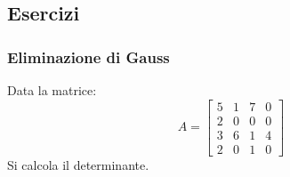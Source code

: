 \documentclass[a4paper]{article}
\begin{document}
	\subsection{Esercizi}
	
	\subsubsection{Eliminazione di Gauss}
	
	Data la matrice:
	\begin{equation*}
		A = \begin{bmatrix}
			5 & 1 & 7 & 0 \\
			2 & 0 & 0 & 0 \\
			3 & 6 & 1 & 4 \\
			2 & 0 & 1 & 0
		\end{bmatrix}
	\end{equation*}
	Si calcola il determinante.\newline
	
\end{document}

